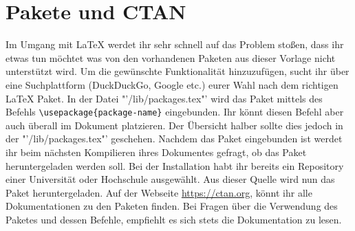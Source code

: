 \section{Pakete und CTAN}

Im Umgang mit \LaTeX{} werdet ihr sehr schnell auf das Problem stoßen, dass ihr etwas tun möchtet was von den vorhandenen Paketen aus dieser Vorlage nicht unterstützt wird. Um die gewünschte Funktionalität hinzuzufügen, sucht ihr über eine Suchplattform (DuckDuckGo, Google etc.) eurer Wahl nach dem richtigen \LaTeX{} Paket. In der Datei "'/lib/packages.tex"' wird das Paket mittels des Befehls \verb|\usepackage{package-name}| eingebunden. Ihr könnt diesen Befehl aber auch überall im Dokument platzieren. Der Übersicht halber sollte dies jedoch in der "'/lib/packages.tex"' geschehen. Nachdem das Paket eingebunden ist werdet ihr beim nächsten Kompilieren ihres Dokumentes gefragt, ob das Paket heruntergeladen werden soll. Bei der Installation habt ihr bereits ein Repository einer Universität oder Hochschule ausgewählt. Aus dieser Quelle wird nun das Paket heruntergeladen. Auf der Webseite \url{https://ctan.org}, könnt ihr alle Dokumentationen zu den Paketen finden. Bei Fragen über die Verwendung des Paketes und dessen Befehle, empfiehlt es sich stets die Dokumentation zu lesen.
